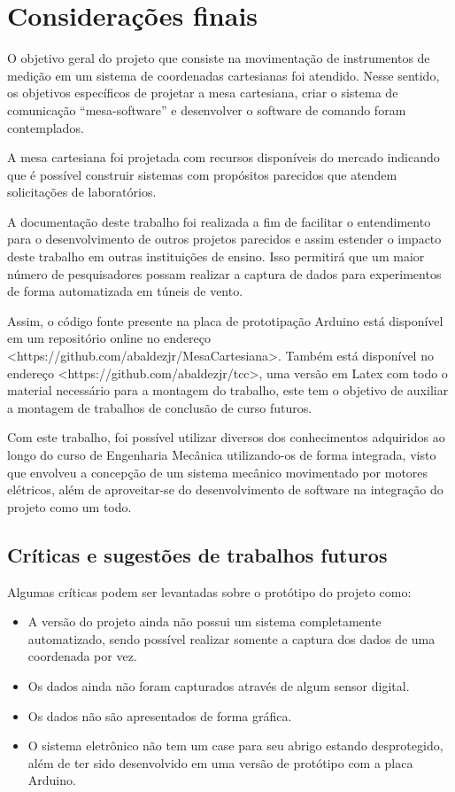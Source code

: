 \chapter{Considerações finais}
\label{chap:conclusao}

O objetivo geral do projeto que consiste na movimentação de instrumentos de medição em um sistema 
de coordenadas cartesianas foi atendido. Nesse sentido, os objetivos específicos de projetar a 
mesa cartesiana, criar o sistema de comunicação “mesa-software” e desenvolver o software 
de comando foram contemplados.

A mesa cartesiana foi projetada com recursos disponíveis do mercado indicando que é possível 
construir sistemas com propósitos parecidos que atendem solicitações de laboratórios.

A documentação deste trabalho foi realizada a fim de facilitar o entendimento 
para o desenvolvimento de outros projetos parecidos e assim estender o impacto deste 
trabalho em outras instituições de ensino. Isso permitirá que um maior número de pesquisadores 
possam realizar a captura de dados para experimentos de forma automatizada em túneis de vento. 

Assim, o código fonte presente na placa de prototipação Arduino está disponível 
em um repositório online no endereço <https://github.com/abaldezjr/MesaCartesiana>. 
Também está disponível no endereço <https://github.com/abaldezjr/tcc>, uma versão em Latex com todo o 
material necessário para a montagem do trabalho, este tem o objetivo de auxiliar a montagem de 
trabalhos de conclusão de curso futuros.

Com este trabalho, foi possível utilizar diversos dos conhecimentos adquiridos ao longo do curso de 
Engenharia Mecânica utilizando-os de forma integrada, visto que envolveu a concepção de um sistema 
mecânico movimentado por motores elétricos, além de aproveitar-se do desenvolvimento de software 
na integração do projeto como um todo.

\section{Críticas e sugestões de trabalhos futuros}\label{sec:criticas}

Algumas críticas podem ser levantadas sobre o protótipo do projeto como:

\begin{itemize}
    \item A versão do projeto ainda não possui um sistema completamente automatizado, sendo possível realizar somente a captura dos dados de uma coordenada por vez.
    \item Os dados ainda não foram capturados através de algum sensor digital.
    \item Os dados não são apresentados de forma gráfica.
    \item O sistema eletrônico não tem um case para seu abrigo estando desprotegido, além de ter sido desenvolvido em uma versão de protótipo com a placa Arduino. 
\end{itemize}

